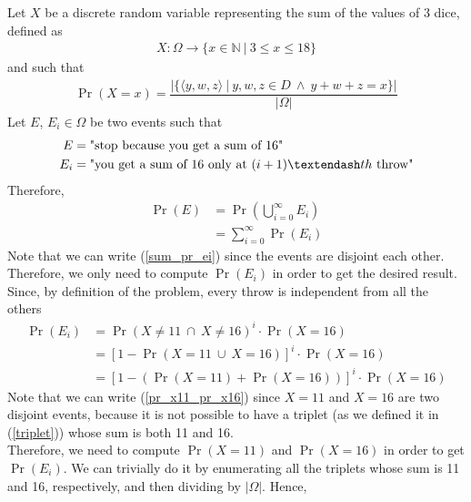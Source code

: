 Let $X$ be a discrete random variable representing the sum of the values of 3 dice, defined as
\begin{align*}
	X: \Omega \rightarrow \{ x \in \mathbb{N} \ | \ 3 \leq x \leq 18 \}
\end{align*}
and such that
\begin{align}
	\Pr(X = x) = \dfrac{|\{ \langle y,w,z \rangle \ | \ y,w,z \in D \ \wedge \ y+w+z = x \}|}{|\Omega|} \label{triplet}
\end{align}
Let $E$, $E_i \in \Omega$ be two events such that
\begin{align*}
	E &= \text{"stop because you get a sum of 16"}\\
	E_i &= \text{"you get a sum of 16 only at $(i+1) \textendash th$ throw"}
\end{align*}
Therefore,
\begin{align}
	\Pr(E) &= \Pr\left(\bigcup_{i = 0}^{\infty} E_i \right) \nonumber\\
	&= \sum_{i = 0}^{\infty}\Pr(E_i) \label{sum_pr_ei}
\end{align}
Note that we can write (\ref{sum_pr_ei}) since the events are disjoint each other.\\
Therefore, we only need to compute $\Pr(E_i)$ in order to get the desired result. Since, by definition of the problem, every throw is independent from all the others
\begin{align}
	\Pr(E_i) &= \Pr( X \ne 11 \ \cap \ X \ne 16 )^i \cdot \Pr(X = 16) \nonumber\\
	&= [1 - \Pr( X = 11 \ \cup \ X = 16)]^i \cdot \Pr(X = 16) \nonumber\\
	&= [1 - (\Pr(X = 11) + \Pr( X = 16))]^i \cdot \Pr(X = 16) \label{pr_x11_pr_x16}
\end{align}
Note that we can write (\ref{pr_x11_pr_x16}) since $X = 11$ and $X = 16$ are two disjoint events, because it is not possible to have a triplet (as we defined it in (\ref{triplet})) whose sum is both 11 and 16.\\
Therefore, we need to compute $\Pr(X = 11)$ and $\Pr( X = 16)$ in order to get $\Pr(E_i)$. We can trivially do it by enumerating all the triplets whose sum is 11 and 16, respectively, and then dividing by $|\Omega|$. Hence,

